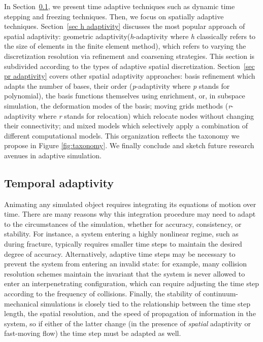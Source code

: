 In Section~\ref{sec t adaptivity}, we present time adaptive techniques such as dynamic time stepping and freezing techniques.
Then, we focus on spatially adaptive techniques.
Section~\ref{sec h adaptivity} discusses the most popular approach of spatial adaptivity: geometric adaptivity(\textit{h}-adaptivity where \textit{h} classically refers to the size of elements in the finite element method), which refers to varying the discretization resolution via refinement and coarsening strategies. This section is subdivided according to the types of adaptive spatial discretization.
Section~\ref{sec pr adaptivity} covers other spatial adaptivity approaches: basis refinement which adapts the number of bases, their order (\textit{p}-adaptivity where \textit{p} stands for polynomial), the basis functions themselves using enrichment, or, in subspace simulation, the deformation modes of the basis; moving grids methods (\textit{r}-adaptivity where \textit{r} stands for relocation) which relocate nodes without changing their connectivity; and mixed models which selectively apply a combination of different computational models. This organization reflects the taxonomy we propose in Figure \ref{fig:taxonomy}.
We finally conclude and sketch future research avenues in adaptive simulation.

\subsection{Temporal adaptivity} \label{sec t adaptivity}

Animating any simulated object requires integrating its equations of motion over time.
There are many reasons why this integration procedure may need to adapt to the circumstances of the simulation, whether for accuracy, consistency, or stability.
For instance, a system entering a highly nonlinear regime, such as during fracture, typically requires smaller time steps to maintain the desired degree of accuracy.
Alternatively, adaptive time steps may be necessary to prevent the system from entering an invalid state: for example, many collision resolution schemes maintain the invariant that the system is never allowed to enter an interpenetrating configuration, which can require adjusting the time step according to the frequency of collisions.
Finally, the stability of continuum-mechanical simulations is closely tied to the relationship between the time step length, the spatial resolution, and the speed of propagation of information in the system, so if either of the latter change (in the presence of \emph{spatial} adaptivity or fast-moving flow) the time step must be adapted as well.



